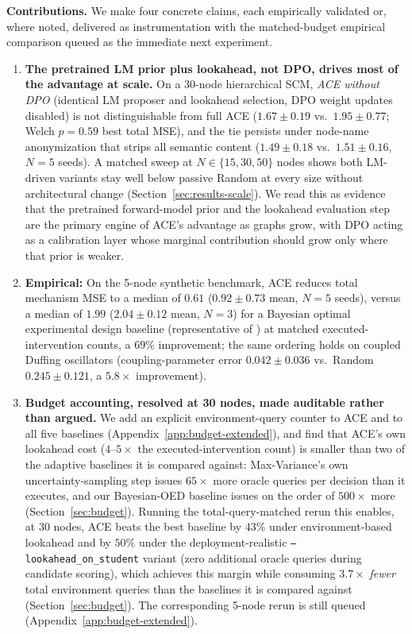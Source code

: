 \documentclass{article}
\theoremstyle{plain}
\theoremstyle{definition}
\theoremstyle{remark}
\begin{document}
\textbf{Contributions.} We make four concrete claims, each empirically validated or, where noted, delivered as instrumentation with the matched-budget empirical comparison queued as the immediate next experiment.
\begin{enumerate}[leftmargin=1.5em,topsep=0.2em,itemsep=0.1em]
\item \textbf{The pretrained LM prior plus lookahead, not DPO, drives most of the advantage at scale.} On a 30-node hierarchical SCM, \emph{ACE without DPO} (identical LM proposer and lookahead selection, DPO weight updates disabled) is not distinguishable from full ACE ($1.67\pm0.19$ vs.\ $1.95\pm0.77$; Welch $p=0.59$ best total MSE), and the tie persists under node-name anonymization that strips all semantic content ($1.49\pm0.18$ vs.\ $1.51\pm0.16$, $N{=}5$ seeds). A matched sweep at $N\in\{15,30,50\}$ nodes shows both LM-driven variants stay well below passive Random at every size without architectural change (Section~\ref{sec:results-scale}). We read this as evidence that the pretrained forward-model prior and the lookahead evaluation step are the primary engine of ACE's advantage as graphs grow, with DPO acting as a calibration layer whose marginal contribution should grow only where that prior is weaker.
\item \textbf{Empirical:} On the 5-node synthetic benchmark, ACE reduces total mechanism MSE to a median of $0.61$ ($0.92\pm0.73$ mean, $N{=}5$ seeds), versus a median of $1.99$ ($2.04\pm0.12$ mean, $N{=}3$) for a Bayesian optimal experimental design baseline (representative of \citealp{toth2022active,tigas2022interventions}) at matched executed-intervention counts, a $69\%$ improvement; the same ordering holds on coupled Duffing oscillators (coupling-parameter error $0.042\pm0.036$ vs.\ Random $0.245\pm0.121$, a $5.8\times$ improvement).
\item \textbf{Budget accounting, resolved at 30 nodes, made auditable rather than argued.} We add an explicit environment-query counter to ACE and to all five baselines (Appendix~\ref{app:budget-extended}), and find that ACE's own lookahead cost ($4$--$5\times$ the executed-intervention count) is smaller than two of the adaptive baselines it is compared against: Max-Variance's own uncertainty-sampling step issues $65\times$ more oracle queries per decision than it executes, and our Bayesian-OED baseline issues on the order of $500\times$ more (Section~\ref{sec:budget}). Running the total-query-matched rerun this enables, at 30 nodes, ACE beats the best baseline by $43\%$ under environment-based lookahead and by $50\%$ under the deployment-realistic \texttt{--lookahead\_on\_student} variant (zero additional oracle queries during candidate scoring), which achieves this margin while consuming $3.7\times$ \emph{fewer} total environment queries than the baselines it is compared against (Section~\ref{sec:budget}). The corresponding 5-node rerun is still queued (Appendix~\ref{app:budget-extended}).

\end{enumerate}
\end{document}
